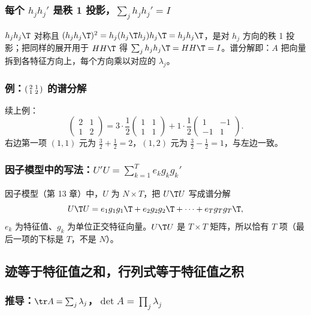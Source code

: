 \subsubsection{每个 \texorpdfstring{$h_jh_j'$}{h h'} 是秩 1 投影，\texorpdfstring{$\sum_jh_jh_j'=I$}{sum h h' = I}}

$h_jh_j\T$ 对称且 $(h_jh_j\T)^2=h_j(h_j\T h_j)h_j\T=h_jh_j\T$，是对 $h_j$ 方向的秩 1 投影；把同样的展开用于 $HH\T$ 得 $\sum_jh_jh_j\T=HH\T=I$。谱分解即：$A$ 把向量拆到各特征方向上，每个方向乘以对应的 $\lambda_j$。

\subsubsection{例：\texorpdfstring{$\begin{psmallmatrix}2&1\\1&2\end{psmallmatrix}$}{[2 1; 1 2]} 的谱分解}

续上例：
\[
\begin{pmatrix}2&1\\1&2\end{pmatrix}=3\cdot\frac12\begin{pmatrix}1&1\\1&1\end{pmatrix}+1\cdot\frac12\begin{pmatrix}1&-1\\-1&1\end{pmatrix}.
\]
右边第一项 $(1,1)$ 元为 $\frac32+\frac12=2$，$(1,2)$ 元为 $\frac32-\frac12=1$，与左边一致。

\subsubsection{因子模型中的写法：\texorpdfstring{$U'U=\sum_{k=1}^Te_kg_kg_k'$}{U'U = sum e g g'}}

因子模型（第 13 章）中，$U$ 为 $N\times T$，把 $U\T U$ 写成谱分解
\[
U\T U=e_1g_1g_1\T+e_2g_2g_2\T+\cdots+e_Tg_Tg_T\T,
\]
$e_k$ 为特征值、$g_k$ 为单位正交特征向量。$U\T U$ 是 $T\times T$ 矩阵，所以恰有 $T$ 项（最后一项的下标是 $T$，不是 $N$）。

\subsection{迹等于特征值之和，行列式等于特征值之积}

\subsubsection{推导：\texorpdfstring{$\tr A=\sum_j\lambda_j$，$\det A=\prod_j\lambda_j$}{tr A = sum lambda, det A = prod lambda}}

